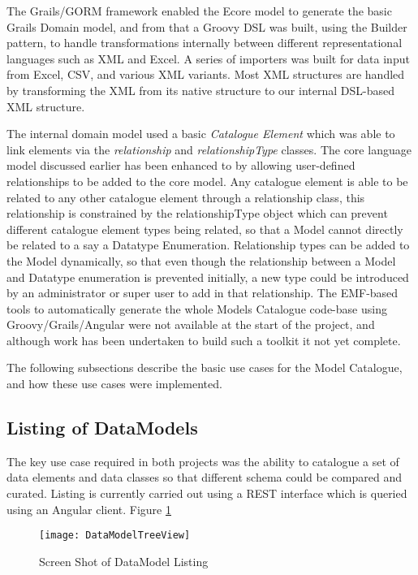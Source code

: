 The Grails/GORM framework enabled the Ecore model to generate the
basic Grails Domain model, and from that a Groovy DSL was built, using
the Builder pattern, to handle transformations internally between
different representational languages such as XML and Excel. A series
of importers was built for data input from Excel, CSV, and various XML
variants. Most XML structures are handled by transforming the XML from
its native structure to our internal DSL-based XML structure.

The internal domain model used a basic \emph{Catalogue Element} which
was able to link elements via the \emph{relationship} and
\emph{relationshipType} classes. The core language model discussed
earlier has been enhanced to by allowing user-defined relationships to
be added to the core model. Any catalogue element is able to be
related to any other catalogue element through a relationship class,
this relationship is constrained by the relationshipType object which
can prevent different catalogue element types being related, so that a
Model cannot directly be related to a say a Datatype
Enumeration. Relationship types can be added to the Model dynamically,
so that even though the relationship between a Model and Datatype
enumeration is prevented initially, a new type could be introduced by
an administrator or super user to add in that relationship. The
EMF-based tools to automatically generate the whole Models Catalogue
code-base using Groovy/Grails/Angular were not available at the start
of the project, and although work has been undertaken to build such a
toolkit it not yet complete.

The following subsections describe the basic use cases for the Model
Catalogue, and how these use cases were implemented.

\subsection{Listing of DataModels}

The key use case required in both projects was the ability to catalogue a set of data elements and data classes so that different schema could be compared and curated. Listing is currently carried out using a REST interface which is queried using an Angular client. Figure \ref{fig:treeviewOfDataModel}
\begin{figure}[here]
	\texttt{[image: DataModelTreeView]}
	\caption{Screen Shot of DataModel Listing} 
	\label{fig:treeviewOfDataModel}	
\end{figure}

